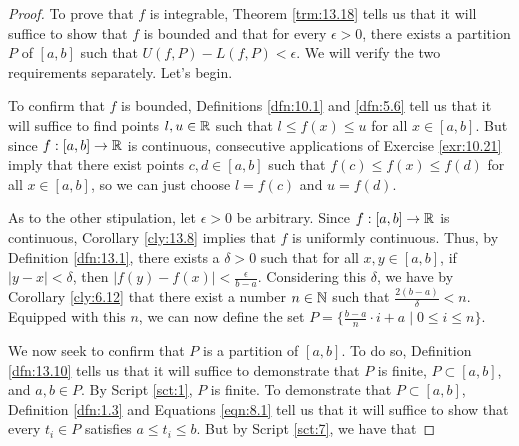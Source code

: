 \documentclass[../main.tex]{subfiles}
\begin{document}
\begin{theorem}
\begin{proof}


        To prove that $f$ is integrable, Theorem \ref{trm:13.18} tells us that it will suffice to show that $f$ is bounded and that for every $\epsilon>0$, there exists a partition $P$ of $[a,b]$ such that $U(f,P)-L(f,P)<\epsilon$. We will verify the two requirements separately. Let's begin.\par\smallskip
        To confirm that $f$ is bounded, Definitions \ref{dfn:10.1} and \ref{dfn:5.6} tell us that it will suffice to find points $l,u\in\mathbb{R}$ such that $l\leq f(x)\leq u$ for all $x\in[a,b]$. But since $f:[a,b]\to\mathbb{R}$ is continuous, consecutive applications of Exercise \ref{exr:10.21} imply that there exist points $c,d\in[a,b]$ such that $f(c)\leq f(x)\leq f(d)$ for all $x\in[a,b]$, so we can just choose $l=f(c)$ and $u=f(d)$.\par\smallskip
        As to the other stipulation, let $\epsilon>0$ be arbitrary. Since $f:[a,b]\to\mathbb{R}$ is continuous, Corollary \ref{cly:13.8} implies that $f$ is uniformly continuous. Thus, by Definition \ref{dfn:13.1}, there exists a $\delta>0$ such that for all $x,y\in[a,b]$, if $|y-x|<\delta$, then $|f(y)-f(x)|<\frac{\epsilon}{b-a}$. Considering this $\delta$, we have by Corollary \ref{cly:6.12} that there exist a number $n\in\mathbb{N}$ such that $\frac{2(b-a)}{\delta}<n$. Equipped with this $n$, we can now define the set $P=\{\frac{b-a}{n}\cdot i+a\mid 0\leq i\leq n\}$.\par
        We now seek to confirm that $P$ is a partition of $[a,b]$. To do so, Definition \ref{dfn:13.10} tells us that it will suffice to demonstrate that $P$ is finite, $P\subset[a,b]$, and $a,b\in P$. By Script \ref{sct:1}, $P$ is finite. To demonstrate that $P\subset[a,b]$, Definition \ref{dfn:1.3} and Equations \ref{eqn:8.1} tell us that it will suffice to show that every $t_i\in P$ satisfies $a\leq t_i\leq b$. But by Script \ref{sct:7}, we have that

\end{proof}
\end{theorem}
\end{document}
